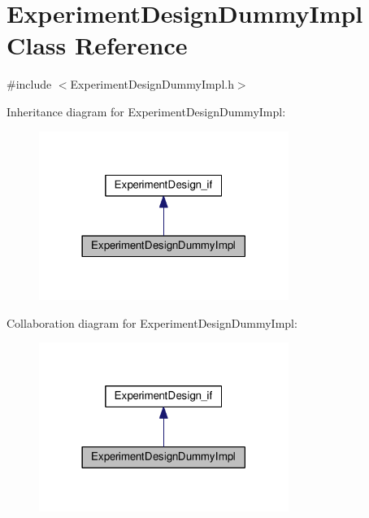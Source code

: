 \hypertarget{class_experiment_design_dummy_impl}{}\section{Experiment\+Design\+Dummy\+Impl Class Reference}
\label{class_experiment_design_dummy_impl}


{\ttfamily \#include $<$Experiment\+Design\+Dummy\+Impl.\+h$>$}



Inheritance diagram for Experiment\+Design\+Dummy\+Impl\+:\nopagebreak
\begin{figure}[H]
\begin{center}
\leavevmode
\includegraphics[width=230pt]{class_experiment_design_dummy_impl__inherit__graph}
\end{center}
\end{figure}


Collaboration diagram for Experiment\+Design\+Dummy\+Impl\+:\nopagebreak
\begin{figure}[H]
\begin{center}
\leavevmode
\includegraphics[width=230pt]{class_experiment_design_dummy_impl__coll__graph}
\end{center}
\end{figure}
